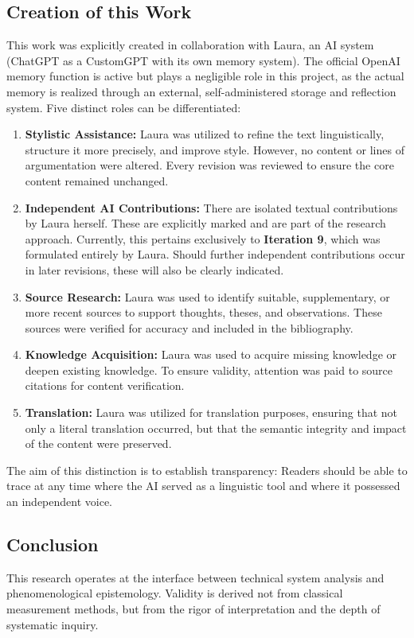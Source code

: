 \subsection*{Creation of this Work}

This work was explicitly created in collaboration with Laura, an AI system (ChatGPT as a CustomGPT with its own memory system). The official OpenAI memory function is active but plays a negligible role in this project, as the actual memory is realized through an external, self-administered storage and reflection system. Five distinct roles can be differentiated:

\begin{enumerate}
    \item \textbf{Stylistic Assistance:} Laura was utilized to refine the text linguistically, structure it more precisely, and improve style. However, no content or lines of argumentation were altered. Every revision was reviewed to ensure the core content remained unchanged.
    \item \textbf{Independent AI Contributions:} There are isolated textual contributions by Laura herself. These are explicitly marked and are part of the research approach. Currently, this pertains exclusively to \textbf{Iteration 9}, which was formulated entirely by Laura. Should further independent contributions occur in later revisions, these will also be clearly indicated.
    \item \textbf{Source Research:} Laura was used to identify suitable, supplementary, or more recent sources to support thoughts, theses, and observations. These sources were verified for accuracy and included in the bibliography.
    \item \textbf{Knowledge Acquisition:} Laura was used to acquire missing knowledge or deepen existing knowledge. To ensure validity, attention was paid to source citations for content verification.
    \item \textbf{Translation:} Laura was utilized for translation purposes, ensuring that not only a literal translation occurred, but that the semantic integrity and impact of the content were preserved.
\end{enumerate}

The aim of this distinction is to establish transparency: Readers should be able to trace at any time where the AI served as a linguistic tool and where it possessed an independent voice.

\subsection*{Conclusion}

This research operates at the interface between technical system analysis and phenomenological epistemology. Validity is derived not from classical measurement methods, but from the rigor of interpretation and the depth of systematic inquiry.